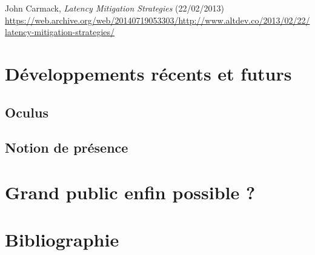 \documentclass[a4]{scrartcl}
\begin{document}
John Carmack, \emph{Latency Mitigation Strategies} (22/02/2013)
\url{https://web.archive.org/web/20140719053303/http://www.altdev.co/2013/02/22/latency-mitigation-strategies/}


\section{Développements récents et futurs}

\subsection{Oculus}
\subsection{Notion de présence}
\section{Grand public enfin possible ?}

\section{Bibliographie}
\end{document}
